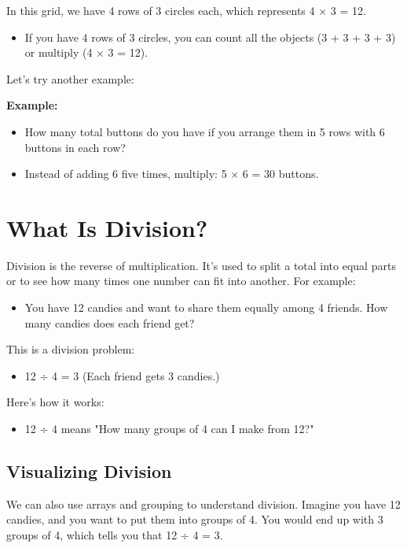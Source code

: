 In this grid, we have 4 rows of 3 circles each, which represents 4 × 3 = 12.
\begin{itemize}
    \item If you have 4 rows of 3 circles, you can count all the objects (3 + 3 + 3 + 3) or multiply (4 × 3 = 12).
\end{itemize}

Let’s try another example:

\textbf{Example:}
\begin{itemize}
    \item How many total buttons do you have if you arrange them in 5 rows with 6 buttons in each row?
    \item Instead of adding 6 five times, multiply: 5 × 6 = 30 buttons.
\end{itemize}

\section{What Is Division?}
Division is the reverse of multiplication. It’s used to split a total into equal parts or to see how many times one number can fit into another. For example:
\begin{itemize}
    \item You have 12 candies and want to share them equally among 4 friends. How many candies does each friend get?
\end{itemize}

This is a division problem:
\begin{itemize}
    \item 12 ÷ 4 = 3 (Each friend gets 3 candies.)
\end{itemize}

Here’s how it works:
\begin{itemize}
    \item 12 ÷ 4 means "How many groups of 4 can I make from 12?"
\end{itemize}

\subsection{Visualizing Division}
We can also use arrays and grouping to understand division. Imagine you have 12 candies, and you want to put them into groups of 4. You would end up with 3 groups of 4, which tells you that 12 ÷ 4 = 3.
\center
\endcenter


